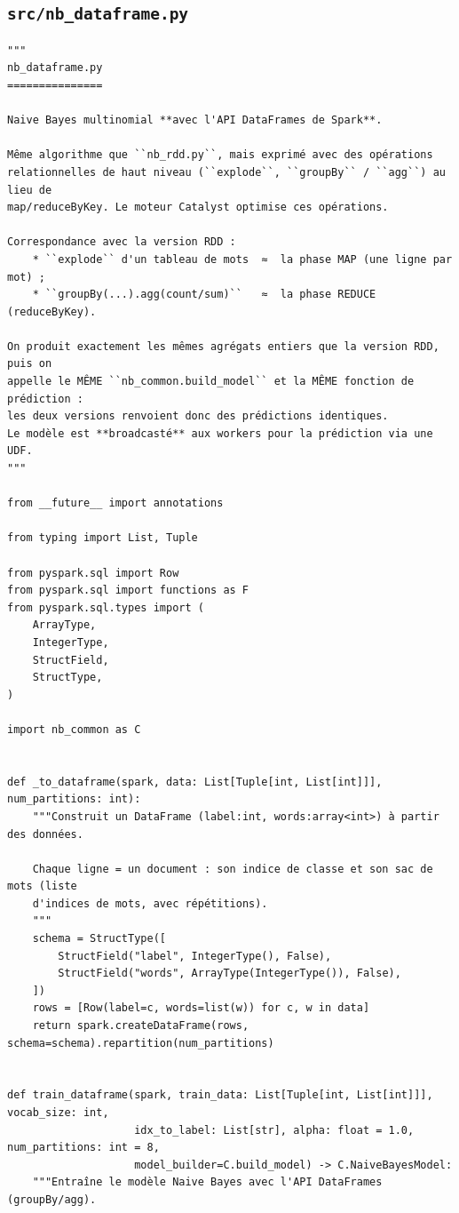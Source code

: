 \subsection{\texttt{src/nb\_dataframe.py}}
\begin{lstlisting}[style=py]
"""
nb_dataframe.py
===============

Naive Bayes multinomial **avec l'API DataFrames de Spark**.

Même algorithme que ``nb_rdd.py``, mais exprimé avec des opérations
relationnelles de haut niveau (``explode``, ``groupBy`` / ``agg``) au lieu de
map/reduceByKey. Le moteur Catalyst optimise ces opérations.

Correspondance avec la version RDD :
    * ``explode`` d'un tableau de mots  ≈  la phase MAP (une ligne par mot) ;
    * ``groupBy(...).agg(count/sum)``   ≈  la phase REDUCE (reduceByKey).

On produit exactement les mêmes agrégats entiers que la version RDD, puis on
appelle le MÊME ``nb_common.build_model`` et la MÊME fonction de prédiction :
les deux versions renvoient donc des prédictions identiques.
Le modèle est **broadcasté** aux workers pour la prédiction via une UDF.
"""

from __future__ import annotations

from typing import List, Tuple

from pyspark.sql import Row
from pyspark.sql import functions as F
from pyspark.sql.types import (
    ArrayType,
    IntegerType,
    StructField,
    StructType,
)

import nb_common as C


def _to_dataframe(spark, data: List[Tuple[int, List[int]]], num_partitions: int):
    """Construit un DataFrame (label:int, words:array<int>) à partir des données.

    Chaque ligne = un document : son indice de classe et son sac de mots (liste
    d'indices de mots, avec répétitions).
    """
    schema = StructType([
        StructField("label", IntegerType(), False),
        StructField("words", ArrayType(IntegerType()), False),
    ])
    rows = [Row(label=c, words=list(w)) for c, w in data]
    return spark.createDataFrame(rows, schema=schema).repartition(num_partitions)


def train_dataframe(spark, train_data: List[Tuple[int, List[int]]], vocab_size: int,
                    idx_to_label: List[str], alpha: float = 1.0, num_partitions: int = 8,
                    model_builder=C.build_model) -> C.NaiveBayesModel:
    """Entraîne le modèle Naive Bayes avec l'API DataFrames (groupBy/agg).


\end{lstlisting}
